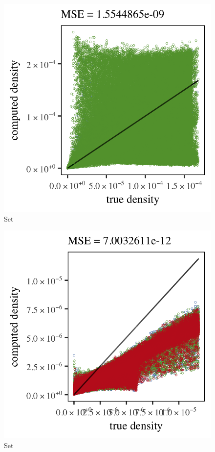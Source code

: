 \begin{subfigure}{0.3\textwidth}
	\centering
	\includegraphics[keepaspectratio=true, width=\textwidth, height=0.23\textheight]{4/img/results_ferdosi_4_600000_sambe_breiman}
	\caption{Set \ferdosiFour}
	\label{fig:4:simulated:datasets:sambe:ferdosi4}
\end{subfigure}
\begin{subfigure}{0.3\textwidth}
	\centering
	\includegraphics[keepaspectratio=true, width=\textwidth, height=0.23\textheight]{4/img/results_ferdosi_5_600000_sambe_breiman}
	\caption{Set \ferdosiFive}
	\label{fig:4:simulated:datasets:sambe:ferdosi5}
\end{subfigure}	